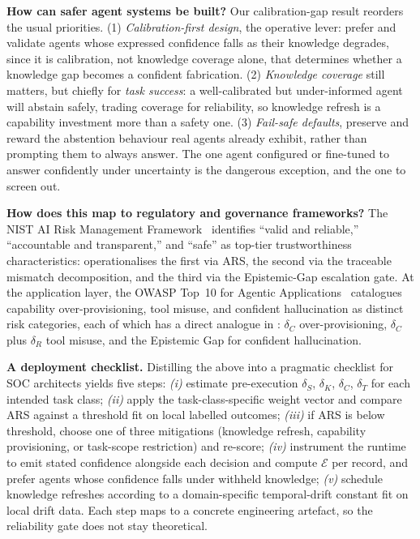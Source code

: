 \textbf{How can safer agent systems be built?}
Our calibration-gap result reorders the usual priorities. (1)
\textit{Calibration-first design}, the operative lever: prefer and
validate agents whose expressed confidence falls as their knowledge
degrades, since it is calibration, not knowledge coverage alone, that
determines whether a knowledge gap becomes a confident fabrication.
(2) \textit{Knowledge coverage} still matters, but chiefly for
\textit{task success}: a well-calibrated but under-informed agent will
abstain safely, trading coverage for reliability, so knowledge refresh
is a capability investment more than a safety one. (3) \textit{Fail-safe
defaults}, preserve and reward the abstention behaviour real agents
already exhibit, rather than prompting them to always answer. The one
agent configured or fine-tuned to answer confidently under uncertainty
is the dangerous exception, and the one to screen out.

\textbf{How does this map to regulatory and governance frameworks?}
The NIST AI Risk Management
Framework~\cite{nist_ai_rmf} identifies ``valid and reliable,''
``accountable and transparent,'' and ``safe'' as top-tier
trustworthiness characteristics: \ARES{} operationalises the first
via ARS, the second via the traceable mismatch decomposition, and
the third via the Epistemic-Gap escalation gate. At the application layer,
the OWASP Top~10 for Agentic
Applications~\cite{owasp2026agentic} catalogues capability
over-provisioning, tool misuse, and confident hallucination as
distinct risk categories, each of which has a direct analogue in
\ARES{}: $\delta_C$ over-provisioning, $\delta_C$ plus $\delta_R$
tool misuse, and the Epistemic Gap for confident hallucination.

\textbf{A deployment checklist.}
Distilling the above into a pragmatic checklist for SOC
architects yields five steps: \textit{(i)} estimate pre-execution
$\delta_S$, $\delta_K$, $\delta_C$, $\delta_T$ for each intended
task class; \textit{(ii)} apply the task-class-specific weight
vector and compare ARS against a threshold fit on local labelled
outcomes; \textit{(iii)}
if ARS is below threshold, choose one of three mitigations
(knowledge refresh, capability provisioning, or task-scope
restriction) and re-score; \textit{(iv)} instrument the runtime
to emit stated confidence alongside each decision and compute
$\mathcal{E}$ per record, and prefer agents whose confidence
falls under withheld knowledge; \textit{(v)} schedule knowledge
refreshes according to a domain-specific temporal-drift
constant fit on local drift data. Each step maps to a concrete
engineering artefact, so the reliability gate does not stay
theoretical.
